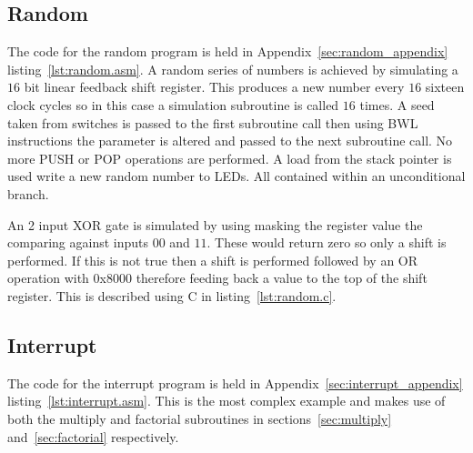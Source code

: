 






\subsection{Random}
The code for the random program is held in Appendix~\ref{sec:random_appendix} listing~\ref{lst:random.asm}.
A random series of numbers is achieved by simulating a $16$ bit linear feedback shift register. 
This produces a new number every $16$ sixteen clock cycles so in this case a simulation subroutine is called $16$ times.
A seed taken from switches is passed to the first subroutine call then using BWL instructions the parameter is altered and passed to the next subroutine call.
No more PUSH or POP operations are performed.
A load from the stack pointer is used write a new random number to LEDs.
All contained within an unconditional branch.

An 2 input XOR gate is simulated by using masking the register value the comparing against inputs $00$ and $11$.
These would return zero so only a shift is performed.
If this is not true then a shift is performed followed by an OR operation with $0$x$8000$ therefore feeding back a value to the top of the shift register.
This is described using C in listing~\ref{lst:random.c}. 







\subsection{Interrupt}
The code for the interrupt program is held in Appendix~\ref{sec:interrupt_appendix} listing~\ref{lst:interrupt.asm}.
This is the most complex example and makes use of both the multiply and factorial subroutines in sections~\ref{sec:multiply} and~\ref{sec:factorial} respectively.






